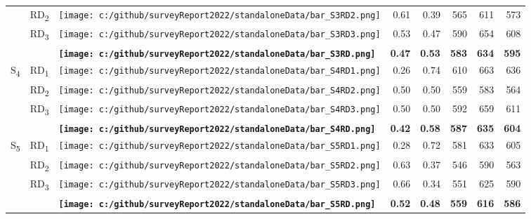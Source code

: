 \documentclass[12pt]{article}\usepackage[]{graphicx}\usepackage[]{color}
\begin{document}
\begin{table}[!h]
\begin{tabular}[t]{lllrrrrr}
 & RD\textsubscript{2} & \raisebox{.01\height} {\texttt{[image: c:/github/surveyReport2022/standaloneData/bar\_S3RD2.png]}} & 0.61 & 0.39 & 565 & 611 & 573\\
 & RD\textsubscript{3} & \raisebox{.01\height} {\texttt{[image: c:/github/surveyReport2022/standaloneData/bar\_S3RD3.png]}} & 0.53 & 0.47 & 590 & 654 & 608\\
\midrule
\textbf{} & \textbf{} & \textbf{\raisebox{.01\height} {\texttt{[image: c:/github/surveyReport2022/standaloneData/bar\_S3RD.png]}}} & \textbf{0.47} & \textbf{0.53} & \textbf{583} & \textbf{634} & \textbf{595}\\
\midrule
S\textsubscript{4} & RD\textsubscript{1} & \raisebox{.01\height} {\texttt{[image: c:/github/surveyReport2022/standaloneData/bar\_S4RD1.png]}} & 0.26 & 0.74 & 610 & 663 & 636\\
 & RD\textsubscript{2} & \raisebox{.01\height} {\texttt{[image: c:/github/surveyReport2022/standaloneData/bar\_S4RD2.png]}} & 0.50 & 0.50 & 559 & 583 & 564\\
 & RD\textsubscript{3} & \raisebox{.01\height} {\texttt{[image: c:/github/surveyReport2022/standaloneData/bar\_S4RD3.png]}} & 0.50 & 0.50 & 592 & 659 & 611\\
\midrule
\textbf{} & \textbf{} & \textbf{\raisebox{.01\height} {\texttt{[image: c:/github/surveyReport2022/standaloneData/bar\_S4RD.png]}}} & \textbf{0.42} & \textbf{0.58} & \textbf{587} & \textbf{635} & \textbf{604}\\
\midrule
S\textsubscript{5} & RD\textsubscript{1} & \raisebox{.01\height} {\texttt{[image: c:/github/surveyReport2022/standaloneData/bar\_S5RD1.png]}} & 0.28 & 0.72 & 581 & 633 & 605\\
 & RD\textsubscript{2} & \raisebox{.01\height} {\texttt{[image: c:/github/surveyReport2022/standaloneData/bar\_S5RD2.png]}} & 0.63 & 0.37 & 546 & 590 & 563\\
 & RD\textsubscript{3} & \raisebox{.01\height} {\texttt{[image: c:/github/surveyReport2022/standaloneData/bar\_S5RD3.png]}} & 0.66 & 0.34 & 551 & 625 & 590\\
\midrule
\textbf{} & \textbf{} & \textbf{\raisebox{.01\height} {\texttt{[image: c:/github/surveyReport2022/standaloneData/bar\_S5RD.png]}}} & \textbf{0.52} & \textbf{0.48} & \textbf{559} & \textbf{616} & \textbf{586}\\
\bottomrule
\end{tabular}
\end{table}
\clearpage
\end{document}
